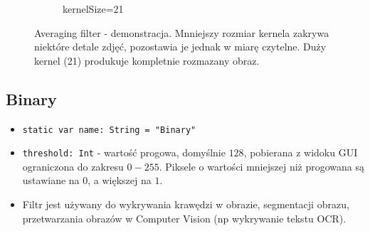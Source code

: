 \documentclass[a4paper]{article}
\begin{document}
\begin{itemize}
\begin{figure}[H]
\begin{subfigure}{0.2\textwidth}
                  \caption{kernelSize=21}
                  \label{fig:trees_averaging_21}
              \end{subfigure}
              \caption{Averaging filter - demonstracja. Mnniejszy rozmiar kernela zakrywa niektóre detale zdjęć, pozostawia je jednak w miarę czytelne. Duży kernel (21) produkuje kompletnie rozmazany obraz.}
              \label{fig:averaging}
          \end{figure}

\end{itemize}

\subsection{Binary}

\begin{itemize}
    \item \texttt{static var name: String = "Binary"}
    \item \texttt{threshold: Int} - wartość progowa, domyślnie $128$, pobierana z widoku GUI ograniczona do zakresu $0-255$. Piksele o wartości mniejszej niż progowana są ustawiane na $0$, a większej na $1$.
    \item Filtr jest używany do wykrywania krawędzi w obrazie, segmentacji obrazu, przetwarzania obrazów w Computer Vision (np wykrywanie tekstu OCR).
\end{itemize}
\end{document}

